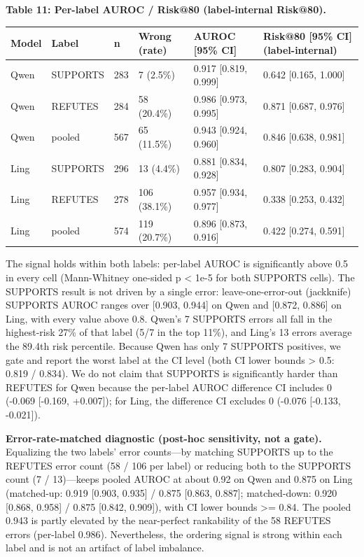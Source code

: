 \documentclass[11pt]{article}
\begin{document}
\textbf{Table 11: Per-label AUROC / Risk@80 (label-internal Risk@80).}

\begin{table}[t]
\centering
\small
\begin{tabular}{llllll}
\toprule
Model & Label & n & Wrong (rate) & AUROC [95\% CI] & Risk@80 [95\% CI] (label-internal) \\
\midrule
Qwen & SUPPORTS & 283 & 7 (2.5\%) & 0.917 [0.819, 0.999] & 0.642 [0.165, 1.000] \\
Qwen & REFUTES & 284 & 58 (20.4\%) & 0.986 [0.973, 0.995] & 0.871 [0.687, 0.976] \\
Qwen & pooled & 567 & 65 (11.5\%) & 0.943 [0.924, 0.960] & 0.846 [0.638, 0.981] \\
Ling & SUPPORTS & 296 & 13 (4.4\%) & 0.881 [0.834, 0.928] & 0.807 [0.283, 0.904] \\
Ling & REFUTES & 278 & 106 (38.1\%) & 0.957 [0.934, 0.977] & 0.338 [0.253, 0.432] \\
Ling & pooled & 574 & 119 (20.7\%) & 0.896 [0.873, 0.916] & 0.422 [0.274, 0.591] \\
\bottomrule
\end{tabular}
\end{table}


The signal holds within both labels: per-label AUROC is significantly above 0.5 in every cell (Mann-Whitney one-sided p < 1e-5 for both SUPPORTS cells). The SUPPORTS result is not driven by a single error: leave-one-error-out (jackknife) SUPPORTS AUROC ranges over [0.903, 0.944] on Qwen and [0.872, 0.886] on Ling, with every value above 0.8. Qwen's 7 SUPPORTS errors all fall in the highest-risk 27\% of that label (5/7 in the top 11\%), and Ling's 13 errors average the 89.4th risk percentile. Because Qwen has only 7 SUPPORTS positives, we gate and report the worst label at the CI level (both CI lower bounds > 0.5: 0.819 / 0.834). We do not claim that SUPPORTS is significantly harder than REFUTES for Qwen because the per-label AUROC difference CI includes 0 (-0.069 [-0.169, +0.007]); for Ling, the difference CI excludes 0 (-0.076 [-0.133, -0.021]).

\textbf{Error-rate-matched diagnostic (post-hoc sensitivity, not a gate).} Equalizing the two labels' error counts—by matching SUPPORTS up to the REFUTES error count (58 / 106 per label) or reducing both to the SUPPORTS count (7 / 13)—keeps pooled AUROC at about 0.92 on Qwen and 0.875 on Ling (matched-up: 0.919 [0.903, 0.935] / 0.875 [0.863, 0.887]; matched-down: 0.920 [0.868, 0.958] / 0.875 [0.842, 0.909]), with CI lower bounds >= 0.84. The pooled 0.943 is partly elevated by the near-perfect rankability of the 58 REFUTES errors (per-label 0.986). Nevertheless, the ordering signal is strong within each label and is not an artifact of label imbalance.
\end{document}
